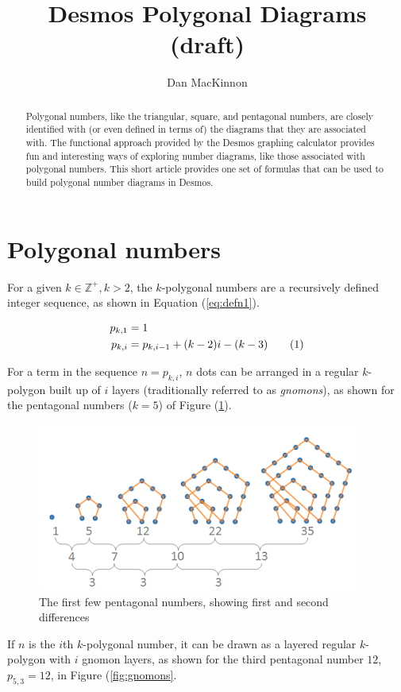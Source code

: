 \documentclass[notitlepage]{report}
\title{Desmos Polygonal Diagrams (draft)}
\author{Dan MacKinnon}
\newcommand\numberthis{\addtocounter{equation}{1}\tag{\theequation}}
\begin{document}
\maketitle
\begin{abstract}
\noindent
Polygonal numbers, like the triangular, square, and pentagonal numbers, are closely identified with (or even defined in terms of) the diagrams that they are associated with. The functional approach provided by the Desmos graphing calculator provides fun and interesting ways of exploring number diagrams, like those associated with polygonal numbers. This short article provides one set of formulas that can be used to build polygonal number diagrams in Desmos.  
\end{abstract}

\section*{Polygonal numbers}
For a given $k \in \mathbb{Z}^+, k>2$, the $k$-polygonal numbers are a recursively defined integer sequence, as shown in Equation (\ref{eq:defn1}). 

\begin{align*}
    p_{k, 1} &= 1 \\
    p_{k,i} &= p_{k,i-1} + (k-2)i - (k-3)
    \numberthis
    \label{eq:defn1}
\end{align*}

For a term in the sequence $n = p_{k,i}$, $n$ dots can be arranged in a regular $k$-polygon built up of $i$ layers (traditionally referred to as \textit{gnomons}), as shown for the pentagonal numbers ($k=5$) of Figure (\ref{fig:pentagonals}). 

\begin{figure}[!htb]
    \centering
    \includegraphics[width=0.5\linewidth]{pentagonal_numbers.PNG}
    \caption{The first few pentagonal numbers, showing first and second differences}
    \label{fig:pentagonals}
\end{figure}

If $n$ is the $i$th $k$-polygonal number, it can be drawn as a layered regular $k$-polygon with $i$ gnomon layers, as shown for the third pentagonal number $12$, $p_{5,3}=12$, in Figure (\ref{fig:gnomons}.
\end{document}
